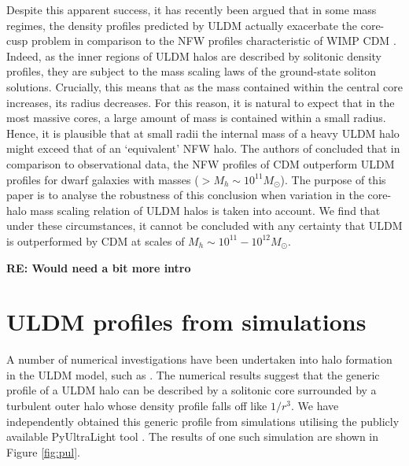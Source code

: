 \documentclass[a4paper,11pt]{article}
\newcommand{\re}[1]{{{\bf \color{green} RE: #1}}}
\begin{document}
Despite this apparent success, it has recently been argued that in some mass regimes, the density profiles predicted by ULDM actually exacerbate the core-cusp problem in comparison to the NFW profiles characteristic of WIMP CDM \cite{Robles:2018fur}. Indeed, as the inner regions of ULDM halos are described by solitonic density profiles, they are subject to the mass scaling laws of the ground-state soliton solutions. Crucially, this means that as the mass contained within the central core increases, its radius decreases. For this reason, it is natural to expect that in the most massive cores, a large amount of mass is contained within a small radius. Hence, it is plausible that at small radii the internal mass of a heavy ULDM halo might exceed that of an `equivalent' NFW halo. The authors of \cite{Robles:2018fur} concluded that in comparison to observational data, the NFW profiles of CDM outperform ULDM profiles for dwarf galaxies with masses ($> M_h \sim 10^{11} M_{\odot}$). The purpose of this paper is to analyse the robustness of this conclusion when variation in the core-halo mass scaling relation of ULDM halos is taken into account. We find that under these circumstances, it cannot be concluded with any certainty that ULDM is outperformed by CDM at scales of $M_h \sim 10^{11}-10^{12} M_{\odot}$.

\re{Would need a bit more intro}

\section{ULDM profiles from simulations}

A number of numerical investigations have been undertaken into halo formation in the ULDM model, such as \cite{Schwabe:2016rze, Mocz:2017wlg, Lin:2018whl}. The numerical results suggest that the generic profile of a ULDM halo can be described by a solitonic core surrounded by a turbulent outer halo whose density profile falls off like $1/r^3$. We have independently obtained this generic profile from simulations utilising the publicly available PyUltraLight tool \cite{Edwards:2018ccc}. The results of one such simulation are shown in Figure \ref{fig:pul}. 
\end{document}
